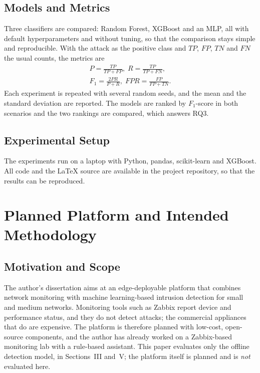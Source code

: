 \documentclass[conference]{IEEEtran}
\newif\ifshowtodo
\newcommand{\todo}[1]{\ifshowtodo{\color{red}\textbf{[TODO: #1]}}\fi}
\begin{document}
\subsection{Models and Metrics}
Three classifiers are compared: Random Forest, XGBoost and an MLP, all with default hyperparameters and without tuning, so that the comparison stays simple and reproducible. With the attack as the positive class and $TP$, $FP$, $TN$ and $FN$ the usual counts, the metrics are
\begin{equation}
\begin{gathered}
P=\tfrac{TP}{TP+FP},\; R=\tfrac{TP}{TP+FN},\\
F_1=\tfrac{2PR}{P+R},\; FPR=\tfrac{FP}{FP+TN}.
\end{gathered}
\label{eq:metrics}
\end{equation}
Each experiment is repeated with several random seeds, and the mean and the standard deviation are reported. \todo{choose the number of repetitions according to computing time} The models are ranked by $F_1$-score in both scenarios and the two rankings are compared, which answers RQ3.

\subsection{Experimental Setup}
The experiments run on a laptop with Python, pandas, scikit-learn and XGBoost. \todo{fill in the exact laptop specifications and library versions after installation} All code and the LaTeX source are available in the project repository, so that the results can be reproduced.

\section{Planned Platform and Intended Methodology}
\subsection{Motivation and Scope}
The author's dissertation aims at an edge-deployable platform that combines network monitoring with machine learning-based intrusion detection for small and medium networks. Monitoring tools such as Zabbix report device and performance status, and they do not detect attacks; the commercial appliances that do are expensive. \todo{add a reference for this statement} The platform is therefore planned with low-cost, open-source components, and the author has already worked on a Zabbix-based monitoring lab with a rule-based assistant. \todo{confirm this wording with the supervisor} This paper evaluates only the offline detection model, in Sections~III and~V; the platform itself is planned and is \emph{not} evaluated here.
\end{document}
